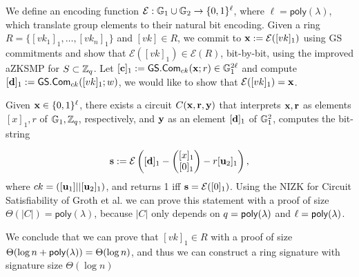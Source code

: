 We define an encoding function $\mathcal{E}:\mathbb{G}_1\cup\mathbb{G}_2\to\{0,1\}^\ell$, where $\ell=\mathsf{poly}(\lambda)$, which translate group elements to their natural bit encoding. Given a ring $R=\{[vk_1]_1,\ldots,[vk_n]_1\}$ and $[vk]\in R$, we commit to $\mathbf{x}:=\mathcal{E}([vk]_1)$ using GS commitments and show that $\mathcal{E}([vk]_1)\in\mathcal{E}(R)$, bit-by-bit, using the improved aZKSMP for $S\subset \mathbb{Z}_q$. Let $[\mathbf{c}]_1:={\mathsf{GS}}.\mathsf{Com}_{ck}(\mathbf{x};r)\in\mathbb{G}_1^{2\ell}$ and compute $[\mathbf{d}]_1:={\mathsf{GS}}.\mathsf{Com}_{ck}([vk]_1;w)$, we would like to show that $\mathcal{E}([vk]_1)=\mathbf{x}$.

Given $\mathbf{x}\in\{0,1\}^\ell$, there exists a circuit $C(\mathbf{x},\mathbf{r},\mathbf{y})$ that interprets $\mathbf{x},\mathbf{r}$ as  elements $[x]_1,r$ of $\mathbb{G}_1,\mathbb{Z}_q$, respectively, and $\mathbf{y}$ as an element $[\mathbf{d}]_1$ of $\mathbb{G}_1^2$, computes the bit-string

$$\mathbf{s}:=\mathcal{E}\left([\mathbf{d}]_1-\left(\begin{matrix}{[x]_1}\\{[0]_1}\end{matrix}\right)-r[\mathbf{u}_2]_1\right),$$
where $ck=([\mathbf{u}_1]||[\mathbf{u}_2]_1)$, and returns 1 iff $\mathbf{s}=\mathcal{E}([0]_1)$. Using the NIZK for Circuit Satisfiability of Groth et al. \cite{EC:GroOstSah06} we can prove this statement with a proof of size $\Theta(|C|)=\mathsf{poly}(\lambda)$, because $|C|$ only depends on $q=\mathsf{poly}(\lambda)$ and $\ell=\mathsf{poly}(\lambda)$.

We conclude that we can prove that $[vk]_1\in R$ with a proof of size $\Theta(\log n +\mathsf{poly}(\lambda))=\Theta(\log n)$, and thus we can construct a ring signature with signature size $\Theta(\log n)$

